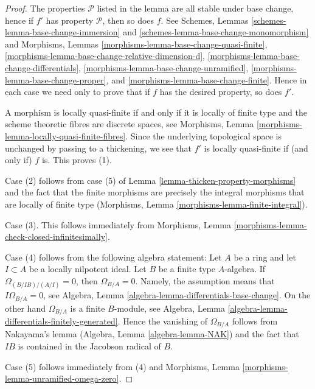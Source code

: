 \begin{proof}
The properties $\mathcal{P}$ listed in the lemma are all stable
under base change, hence if $f'$ has property $\mathcal{P}$, then so
does $f$. See
Schemes, Lemmas \ref{schemes-lemma-base-change-immersion} and
\ref{schemes-lemma-base-change-monomorphism}
and
Morphisms, Lemmas
\ref{morphisms-lemma-base-change-quasi-finite},
\ref{morphisms-lemma-base-change-relative-dimension-d},
\ref{morphisms-lemma-base-change-differentials},
\ref{morphisms-lemma-base-change-unramified},
\ref{morphisms-lemma-base-change-proper}, and
\ref{morphisms-lemma-base-change-finite}.
Hence in each case we need only to prove that if $f$ has
the desired property, so does $f'$.

\medskip\noindent
A morphism is locally quasi-finite if and only if it is locally
of finite type and the scheme theoretic fibres are discrete spaces, see
Morphisms, Lemma \ref{morphisms-lemma-locally-quasi-finite-fibres}.
Since the underlying topological space is unchanged by 
passing to a thickening, we see that $f'$ is locally quasi-finite if
(and only if) $f$ is. This proves (1).

\medskip\noindent
Case (2) follows from case (5) of Lemma \ref{lemma-thicken-property-morphisms}
and the fact that the finite morphisms are precisely
the integral morphisms that are locally of finite type
(Morphisms, Lemma \ref{morphisms-lemma-finite-integral}).

\medskip\noindent
Case (3). This follows immediately from
Morphisms, Lemma \ref{morphisms-lemma-check-closed-infinitesimally}.

\medskip\noindent
Case (4) follows from the following algebra statement: Let $A$ be a ring and
let $I \subset A$ be a locally nilpotent ideal. Let $B$ be a finite type
$A$-algebra. If $\Omega_{(B/IB)/(A/I)} = 0$, then $\Omega_{B/A} = 0$.
Namely, the assumption means that $I\Omega_{B/A} = 0$, see
Algebra, Lemma \ref{algebra-lemma-differentials-base-change}.
On the other hand $\Omega_{B/A}$ is a finite $B$-module, see
Algebra, Lemma \ref{algebra-lemma-differentials-finitely-generated}.
Hence the vanishing of $\Omega_{B/A}$ follows from Nakayama's
lemma (Algebra, Lemma \ref{algebra-lemma-NAK}) and the fact
that $IB$ is contained in the Jacobson radical of $B$.

\medskip\noindent
Case (5) follows immediately from (4) and
Morphisms, Lemma \ref{morphisms-lemma-unramified-omega-zero}.


\end{proof}
